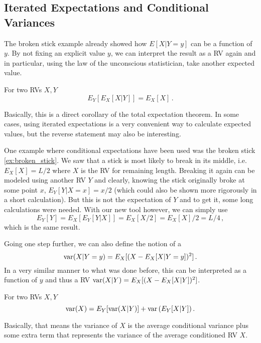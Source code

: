	\subsection{Iterated Expectations and Conditional Variances}
The broken stick example already showed how $E[X | Y = y]$ can be a function of $y$. By not fixing an explicit value $y$, we can interpret the result as a RV again and in particular, using the law of the unconscious statistician, take another expected value.
\begin{prop}
For two RVs $X, Y$
\begin{equation}
E_Y[E_X[X | Y]] = E_X[X] \,. 
\end{equation}
\end{prop}
Basically, this is a direct corollary of the total expectation theorem. In some cases, using iterated expectations is a very convenient way to calculate expected values, but the reverse statement may also be interesting.


\begin{ex}
One example where conditional expectations have been used was the broken stick \ref{ex:broken_stick}. We saw that a stick is most likely to break in its middle, i.e.~$E_X[X] = L / 2$ where $X$ is the RV for remaining length. Breaking it again can be modeled using another RV $Y$ and clearly, knowing the stick originally broke at some point $x$, $E_Y[Y | X = x] = x / 2$ (which could also be shown more rigorously in a short calculation). But this is not the expectation of $Y$ and to get it, some long calculations were needed. With our new tool however, we can simply use
\begin{equation*}
E_Y[Y] = E_X[E_Y[Y | X]] = E_X[X / 2] = E_X[X] / 2 = L / 4 \, ,
\end{equation*}
which is the same result.
\end{ex}


Going one step further, we can also define the notion of a 
\begin{equation}
\operatorname{var}(X | Y = y) = E_X[(X - E_X[X | Y = y])^2] \, .
\end{equation}
In a very similar manner to what was done before, this can be interpreted as a function of $y$ and thus a RV $\operatorname{var}(X | Y) = E_X[(X - E_X[X | Y])^2]$.
\begin{prop}
For two RVs $X, Y$
\begin{equation}
\operatorname{var}(X) = E_Y\qty[\operatorname{var}(X | Y)] + \operatorname{var}\qty(E_Y[X | Y]) \, .
\end{equation}
\end{prop}
Basically, that means the variance of $X$ is the average conditional variance plus some extra term that represents the variance of the average conditioned RV $X$.



